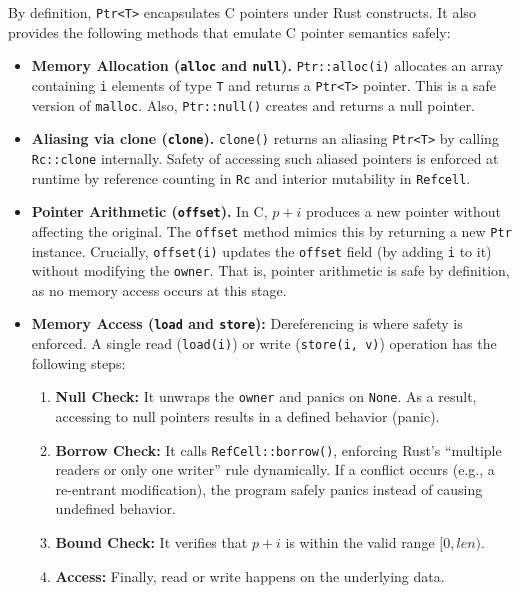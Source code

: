 \documentclass{llncs} %
\begin{document}
By definition, \texttt{Ptr<T>} encapsulates C pointers under Rust constructs. It also provides the following methods that emulate C pointer semantics safely:

\begin{itemize}
    \item \textbf{Memory Allocation (\texttt{alloc} and \texttt{null}).}
    \texttt{Ptr::alloc(i)} allocates an array containing \texttt{i} elements of type \texttt{T} and returns a \texttt{Ptr<T>} pointer. This is a safe version of \texttt{malloc}. Also, \texttt{Ptr::null()} creates and returns a null pointer.

    \item \textbf{Aliasing via clone (\texttt{clone}).} \texttt{clone()} returns an aliasing \texttt{Ptr<T>} by calling \texttt{Rc::clone} internally. Safety of accessing such aliased pointers is enforced at runtime by reference counting in \texttt{Rc} and interior mutability in \texttt{Refcell}.
    \item \textbf{Pointer Arithmetic (\texttt{offset}).} 
    In C, $p + i$ produces a new pointer without affecting the original. The \texttt{offset} method mimics this by returning a new \texttt{Ptr} instance. Crucially, \texttt{offset(i)} updates the \texttt{offset} field (by adding \texttt{i} to it) without modifying the \texttt{owner}. That is, pointer arithmetic is safe by definition, as no memory access occurs at this stage.
    
    \item \textbf{Memory Access (\texttt{load} and \texttt{store}):} 
    Dereferencing is where safety is enforced. A single read (\texttt{load(i)}) or write (\texttt{store(i, v)}) operation has the following steps:
    \begin{enumerate}
        \item \textbf{Null Check:} It unwraps the \texttt{owner} and panics on \texttt{None}. As a result, accessing to null pointers results in a defined behavior (panic). 
        \item \textbf{Borrow Check:} It calls \texttt{RefCell::borrow()}, enforcing Rust's ``multiple readers or only one writer'' rule dynamically. If a conflict occurs (e.g., a re-entrant modification), the program safely panics instead of causing undefined behavior.
        \item \textbf{Bound Check:} It verifies that $p + i$ is within the valid range $[0, len)$.
        \item \textbf{Access:} Finally, read or write happens on the underlying data.
    \end{enumerate}
\end{itemize}
\end{document}
